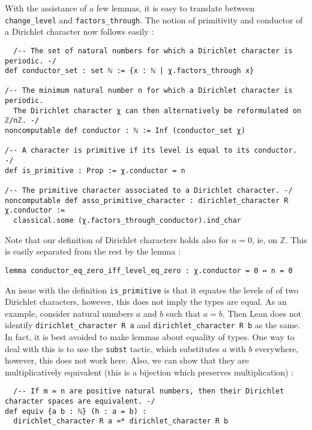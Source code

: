 \documentclass[a4paper,UKenglish,cleveref, autoref, thm-restate]{lipics-v2021}
\newcommand{\lean}[1]{\texttt{#1}\xspace} %
\begin{document}
With the assistance of a few lemmas, it is easy to translate between \lean{change\_level} and \lean{factors\_through}. The notion of primitivity 
and conductor of a Dirichlet character now follows easily : 
\begin{lstlisting}
  /-- The set of natural numbers for which a Dirichlet character is periodic. -/
def conductor_set : set ℕ := {x : ℕ | χ.factors_through x}

/-- The minimum natural number n for which a Dirichlet character is periodic.
  The Dirichlet character χ can then alternatively be reformulated on ℤ/nℤ. -/
noncomputable def conductor : ℕ := Inf (conductor_set χ)

/-- A character is primitive if its level is equal to its conductor. -/
def is_primitive : Prop := χ.conductor = n

/-- The primitive character associated to a Dirichlet character. -/
noncomputable def asso_primitive_character : dirichlet_character R χ.conductor :=
  classical.some (χ.factors_through_conductor).ind_char
\end{lstlisting}

Note that our definition of Dirichlet characters holds also for $n = 0$, ie, on $\mathbb{Z}$. 
This is easily separated from the rest by the lemma : 
\begin{lstlisting}
lemma conductor_eq_zero_iff_level_eq_zero : χ.conductor = 0 ↔ n = 0
\end{lstlisting}

An issue with the definition \lean{is\_primitive} is that it equates the levels of of two Dirichlet characters, 
however, this does not imply the types are equal. As an example, consider natural numbers $a$ and $b$ such that 
$a = b$. Then Lean does not identify \lean{dirichlet\_character R a} and \lean{dirichlet\_character R b} as the 
same. In fact, it is best avoided to make lemmas about equality of types. One way to deal with this is to use 
the \lean{subst} tactic, which substitutes $a$ with $b$ everywhere, however, this does not work here. Also, we 
can show that they are multiplicatively equivalent (this is a bijection which preserves multiplication) : 
\begin{lstlisting}
  /-- If m = n are positive natural numbers, then their Dirichlet character spaces are equivalent. -/
def equiv {a b : ℕ} (h : a = b) :
  dirichlet_character R a ≃* dirichlet_character R b
\end{lstlisting}
\end{document}
